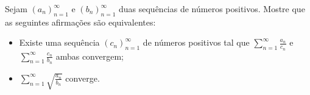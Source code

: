 Sejam \((a_n)_{n=1}^{\infty}\) e \((b_n)_{n=1}^{\infty}\) duas sequências de números positivos. Mostre que as seguintes afirmações são equivalentes:
\begin{itemize}
	\item Existe uma sequência \((c_n)_{n=1}^{\infty}\) de números positivos tal que \(\sum_{n=1}^{\infty}{\frac{a_n}{c_n}}\) e \(\sum_{n=1}^{\infty}{\frac{c_n}{b_n}}\) ambas convergem;
	\item \(\sum_{n=1}^{\infty}{\sqrt{\frac{a_n}{b_n}}}\) converge.
\end{itemize}

